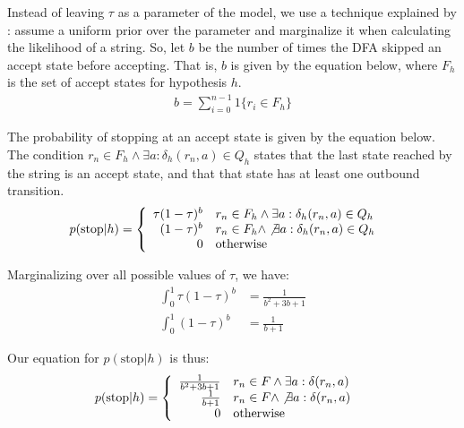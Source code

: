 \documentclass[10pt,letterpaper]{article}
\begin{document}
Instead of leaving $\tau$ as a parameter of the model, we use a technique explained by : assume a uniform prior over the parameter and marginalize it when calculating the likelihood of a string. So, let $b$ be the number of times the DFA skipped an accept state before accepting. That is, $b$ is given by the equation below, where $F_h$ is the set of accept states for hypothesis $h$.
\begin{align*}
	b = \sum_{i=0}^{n-1} 1 \{ r_i \in F_h\}
\end{align*}

The probability of stopping at an accept state is given by the equation below. The condition $r_n \in F_h \wedge \exists a : \delta_h(r_n, a)\in Q_h$ states that the last state reached by the string is an accept state, and that that state has at least one outbound transition.
\begin{align*}
	p(\text{stop}|h) &= \left\{
		\begin{array}{rl}
		\tau (1-\tau)^b & r_n \in F_h \wedge \exists a : \delta_h(r_n, a)\in Q_h
		\\ (1-\tau)^b & r_n \in F_h \wedge \not \exists a : \delta_h(r_n, a)\in Q_h
		\\ 0 & \text{otherwise}
		\end{array}
		\right.
\end{align*}

Marginalizing over all possible values of $\tau$, we have:
\begin{align*}
	\int_0^1 \tau (1-\tau)^b &= \frac{1}{b^2+3b+1}
	\\ \int_0^1 (1-\tau)^b &= \frac{1}{b+1}
\end{align*}

Our equation for $p(\text{stop}|h)$ is thus:
\begin{align*}
	p(\text{stop}|h) &= \left\{
		\begin{array}{rl}
		\frac{1}{b^2+3b+1} & r_n \in F \wedge \exists a : \delta(r_n, a)
		\\ \frac{1}{b+1} & r_n \in F \wedge \not \exists a : \delta(r_n, a)
		\\ 0 & \text{otherwise}
		\end{array}
		\right.
\end{align*}
\end{document}
